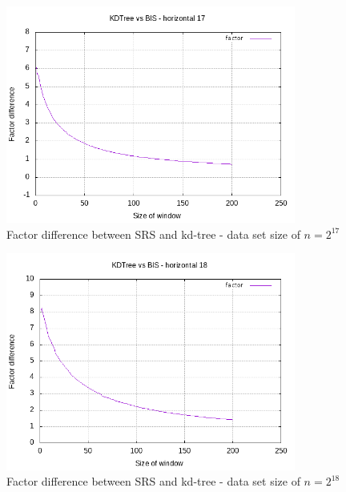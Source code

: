 \clearpage

\begin{figure}[h]
    \centering
    \includegraphics[width = 0.85\textwidth]{pictures/analysis/smalls/hori_fac_17.png}
    \caption{Factor difference between SRS and kd-tree - data set size of $n=2^{17}$}\label{fig:small_hori_fac_17}
\end{figure}

\begin{figure}[h]
    \centering
    \includegraphics[width = 0.85\textwidth]{pictures/analysis/smalls/hori_fac_18.png}
    \caption{Factor difference between SRS and kd-tree - data set size of $n=2^{18}$}\label{fig:small_hori_fac_18}
\end{figure}

